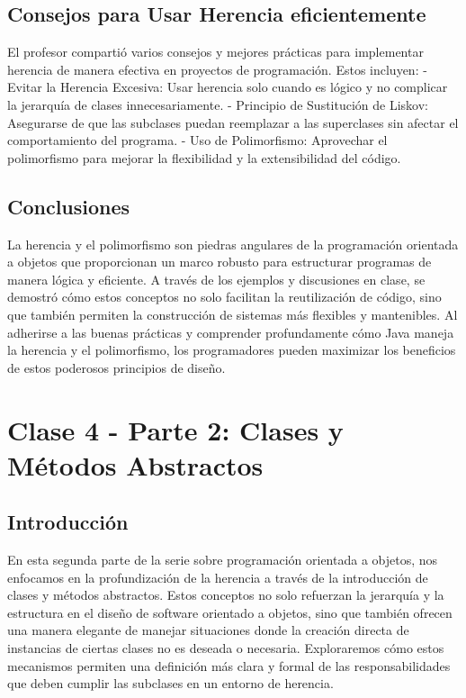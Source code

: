 \documentclass[a4paper]{report}
\begin{document}
\section{Consejos para Usar Herencia eficientemente}
El profesor compartió varios consejos y mejores prácticas para implementar herencia de manera efectiva en proyectos de programación. Estos incluyen:
- Evitar la Herencia Excesiva: Usar herencia solo cuando es lógico y no complicar la jerarquía de clases innecesariamente.
- Principio de Sustitución de Liskov: Asegurarse de que las subclases puedan reemplazar a las superclases sin afectar el comportamiento del programa.
- Uso de Polimorfismo: Aprovechar el polimorfismo para mejorar la flexibilidad y la extensibilidad del código.


\section{Conclusiones}
La herencia y el polimorfismo son piedras angulares de la programación orientada a objetos que proporcionan un marco robusto para estructurar programas de manera lógica y eficiente. A través de los ejemplos y discusiones en clase, se demostró cómo estos conceptos no solo facilitan la reutilización de código, sino que también permiten la construcción de sistemas más flexibles y mantenibles. Al adherirse a las buenas prácticas y comprender profundamente cómo Java maneja la herencia y el polimorfismo, los programadores pueden maximizar los beneficios de estos poderosos principios de diseño.

\newpage
\maketitle

\chapter{Clase 4 - Parte 2: Clases y Métodos Abstractos}
\section{Introducción}
En esta segunda parte de la serie sobre programación orientada a objetos, nos enfocamos en la profundización de la herencia a través de la introducción de clases y métodos abstractos. Estos conceptos no solo refuerzan la jerarquía y la estructura en el diseño de software orientado a objetos, sino que también ofrecen una manera elegante de manejar situaciones donde la creación directa de instancias de ciertas clases no es deseada o necesaria. Exploraremos cómo estos mecanismos permiten una definición más clara y formal de las responsabilidades que deben cumplir las subclases en un entorno de herencia.
\end{document}

